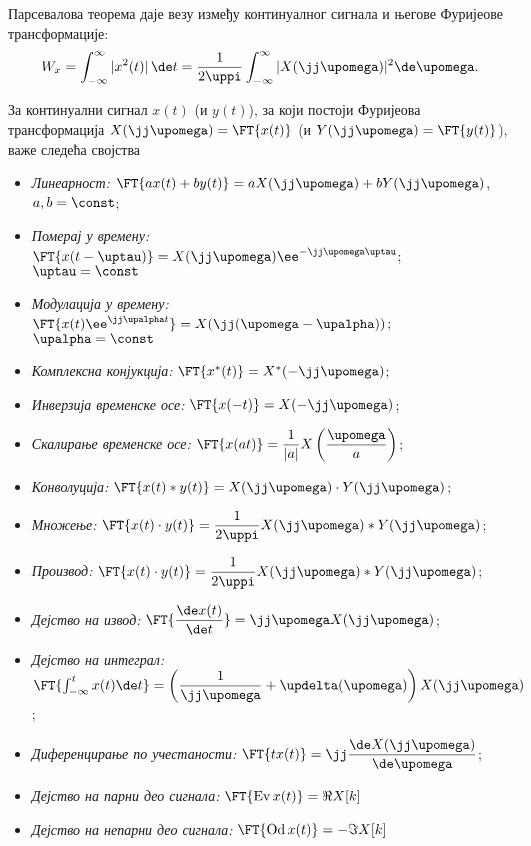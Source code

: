 \noindent 
Парсевалова теорема даје везу између  континуалног сигнала и његове
Фуријеове трансформације:
\begin{equation}
W_x = \int_{-\infty}^{\infty} |x^2(t)|\,\de t = \dfrac{1}{2\uppi}\int_{-\infty}^{\infty} |X(\jj\upomega)|^2 \de \upomega. \label{s:ctft:parseval}
\end{equation}


За континуални сигнал $x(t)$ (и $y(t)$), за који постоји Фуријеова трансформација
$X(\jj\upomega) = \FT{x(t)}$ (и $Y(\jj\upomega) = \FT{y(t)}$), важе следећа својства
\begin{itemize}
    \item \emph{Линеарност:} $\FT{ax(t) + by(t)} = a X(\jj\upomega) + b Y(\jj\upomega)$, \qquad $a,b = \const$;
    \item \emph{Померај у времену:} $\FT{x(t-\uptau)} = X(\jj\upomega) \ee^{-\jj\upomega \uptau}$; \qquad $\uptau = \const$
    \item \emph{Модулација у времену:} $\FT{x(t) \ee^{\jj\upalpha t}} = X(\jj(\upomega - \upalpha))$; \qquad $\upalpha = \const$
    \item \emph{Комплексна конјукција:} $\FT{x^{\ast}(t) } = X^{\ast}(-\jj\upomega)$; 
    \item \emph{Инверзија временске осе:} $\FT{x(-t) } = X(-\jj\upomega)$; 
    \item \emph{Скалирање временске осе:} $\FT{x(at)} = \dfrac{1}{|a|} X\left( \dfrac{\upomega}{a} \right)$;
    \item \emph{Конволуција:} $\FT{x(t) \ast y(t)} = X(\jj\upomega) \cdot Y(\jj\upomega)$; 
    \item \emph{Множење:} $\FT{x(t) \cdot y(t)} = \dfrac{1}{2\uppi} X(\jj\upomega) \ast Y(\jj\upomega)$; 
    \item \emph{Производ:} $\FT{x(t) \cdot y(t)} = \dfrac{1}{2\uppi} X(\jj\upomega) \ast Y(\jj\upomega)$;
    \item \emph{Дејство на извод:} $ \FT{ \dfrac{ \de x(t)}{\de t}} = \jj\upomega X(\jj\upomega)$;
    \item \emph{Дејство на интеграл:} $ \FT{ \int_{-\infty}^{t} x(t) \de t} =  
    \left( 
        \dfrac{1}{\jj\upomega} + \updelta(\upomega)
    \right) X(\jj\upomega)$;
    \item \emph{Диференцирање по учестаности:} 
    $
    \FT{ t x(t) } = \jj \dfrac{\de X(\jj\upomega)}{\de \upomega}
    $;
    \item \emph{Дејство на парни део сигнала:}
    $
    \FT{ \operatorname{Ev}x(t)} = \Re{X[k]}
    $
    \item \emph{Дејство на непарни део сигнала:}
    $
    \FT{ \operatorname{Od}x(t)} = -\Im{X[k]}
    $
    
\end{itemize} 


